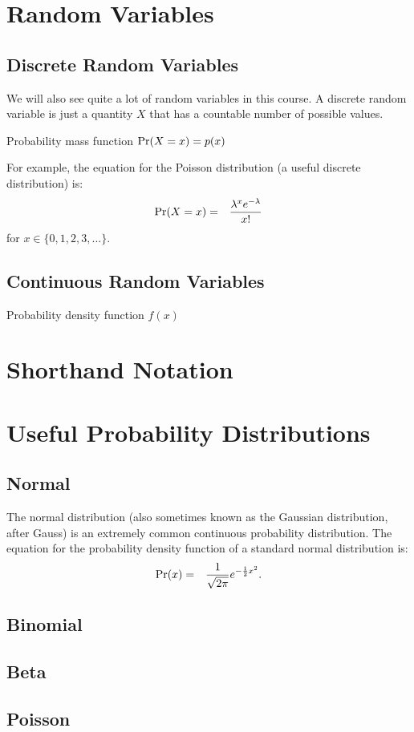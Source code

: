 \section{Random Variables}

\subsection{Discrete Random Variables}
We will also see quite a lot of random variables in this course. A discrete
random variable is just a quantity $X$ that has a countable number of possible
values.

Probability mass function
$\textnormal{Pr}(X=x) = p(x)$

For example, the equation for the Poisson distribution (a useful discrete
distribution) is:
\begin{eqnarray}
\textnormal{Pr}(X=x) &=& \frac{\lambda^x e^{-\lambda}}{x!}
\end{eqnarray}
for $x \in \{0, 1, 2, 3, ...\}$.

\subsection{Continuous Random Variables}
Probability density function
$f(x)$


\section{Shorthand Notation}

\pr

\section{Useful Probability Distributions}

\subsection{Normal}
The normal distribution (also sometimes known as the Gaussian distribution,
after Gauss) is an extremely common continuous probability distribution.
The equation for the probability density function of a standard normal
distribution is:
\begin{eqnarray}
\textnormal{Pr}(x) &=& \frac{1}{\sqrt{2\pi}}e^{-\frac{1}{2}x^2}.
\end{eqnarray}

\subsection{Binomial}


\subsection{Beta}


\subsection{Poisson}


